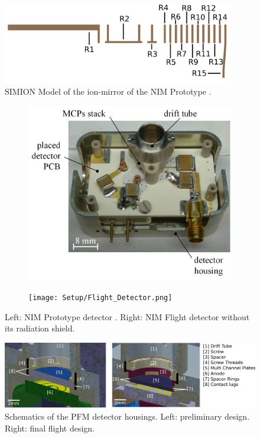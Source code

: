 	\begin{figure}[H] %
		\centering
		\includegraphics[width=0.9\textwidth]{Setup/Prototype_Reflectron_sim.png}
		\caption{SIMION Model of the ion-mirror of the NIM Prototype \cite{Diss_Meyer}.}
		\label{fig:SetupProtoReflSim}
	\end{figure}
	\begin{figure}[H] %
		\begin{subfigure}{0.5\textwidth}
			\centering
			\includegraphics[width=\textwidth]{Setup/Prototype_Detector.png}
		\end{subfigure}
		\begin{subfigure}{0.5\textwidth}
			\centering
			\texttt{[image: Setup/Flight\_Detector.png]}
		\end{subfigure}
		\caption{Left: NIM Prototype detector \cite{Diss_Meyer}. Right: NIM Flight detector without its radiation shield.}
		\label{fig:DetPhotos}
	\end{figure}
	\begin{figure}[h] %
		\centering
		\includegraphics[width= \textwidth]{Setup/PFMDetectors.png}
		\caption{Schematics of the PFM detector housings. Left: preliminary design. Right: final flight design.}
		\label{fig:FlightDetSchemata}
	\end{figure}
